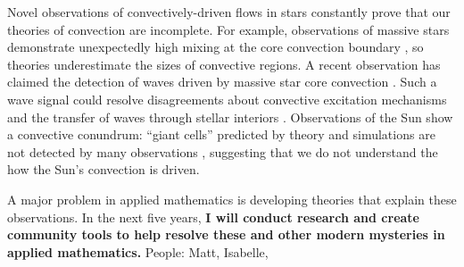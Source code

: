 \documentclass[12pt]{article}
\begin{document}
\thispagestyle{fancy}

Novel observations of convectively-driven flows in stars constantly prove that our theories of convection are incomplete.
For example, observations of massive stars demonstrate unexpectedly high mixing at the core convection boundary \citep{johnston_2021}, so theories underestimate the sizes of convective regions.
A recent observation has claimed the detection of waves driven by massive star core convection \citep{bowman_etal_2019}.
Such a wave signal could resolve disagreements about convective excitation mechanisms and the transfer of waves through stellar interiors \citep{rogers_etal_2013,lecoanet_etal_2021}.
Observations of the Sun show a convective conundrum: ``giant cells'' predicted by theory and simulations are not detected by many observations \citep{hanasoge&all2012,proxauf_2021}, suggesting that we do not understand the how the Sun's convection is driven.

A major problem in applied mathematics is developing theories that explain these observations.
In the next five years, \textbf{I will conduct research and create community tools to help resolve these and other modern mysteries in applied mathematics.}
People: Matt, Isabelle, 

\end{document}
